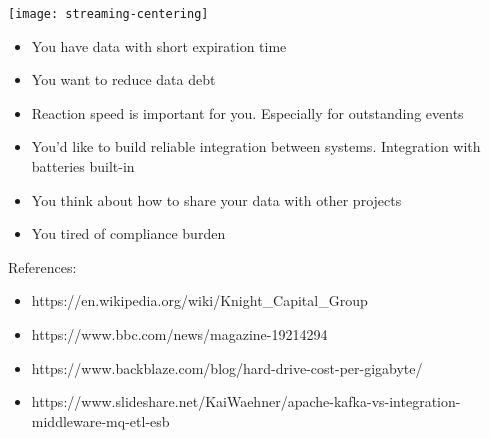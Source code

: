 \documentclass[aspectratio=169, 15pt,usenames,dvipsnames]{beamer}
\begin{document}
\begin{gdsw}
	\centering\texttt{[image: streaming-centering]}         
	\begin{center} 
		\begin{itemize}
			\item You have data with short expiration time
			      \pause
			\item You want to reduce data debt
			      \pause
			\item Reaction speed is important for you. Especially for outstanding events
			      \pause
			\item You'd like to build reliable integration between systems. Integration with batteries built-in
			      \pause
			\item You think about how to share your data with other projects
			      \pause
			\item You tired of compliance burden
		\end{itemize}
	\end{center}
\end{gdsw}
\begin{gdsw}
	\par
	References:
	\begin{center}\tiny
		\begin{itemize}
			\item https://en.wikipedia.org/wiki/Knight\_Capital\_Group
			\item https://www.bbc.com/news/magazine-19214294
			\item https://www.backblaze.com/blog/hard-drive-cost-per-gigabyte/
			\item https://www.slideshare.net/KaiWaehner/apache-kafka-vs-integration-middleware-mq-etl-esb
		\end{itemize}
	\end{center}
\end{gdsw}    	
\end{document}
